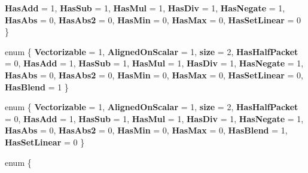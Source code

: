 \begin{DoxyCompactItemize}
{\bfseries Has\+Add} = 1, 
{\bfseries Has\+Sub} = 1, 
{\bfseries Has\+Mul} = 1, 
{\bfseries Has\+Div} = 1, 
\newline
{\bfseries Has\+Negate} = 1, 
{\bfseries Has\+Abs} = 0, 
{\bfseries Has\+Abs2} = 0, 
{\bfseries Has\+Min} = 0, 
\newline
{\bfseries Has\+Max} = 0, 
{\bfseries Has\+Set\+Linear} = 0
 \}
\item 
\mbox{\label{struct_eigen_1_1internal_1_1packet__traits_3_01std_1_1complex_3_01float_01_4_01_4_afbd46217ba20215fdce9b0b8c8995961}} 
enum \{ \newline
{\bfseries Vectorizable} = 1, 
{\bfseries Aligned\+On\+Scalar} = 1, 
{\bfseries size} = 2, 
{\bfseries Has\+Half\+Packet} = 0, 
\newline
{\bfseries Has\+Add} = 1, 
{\bfseries Has\+Sub} = 1, 
{\bfseries Has\+Mul} = 1, 
{\bfseries Has\+Div} = 1, 
\newline
{\bfseries Has\+Negate} = 1, 
{\bfseries Has\+Abs} = 0, 
{\bfseries Has\+Abs2} = 0, 
{\bfseries Has\+Min} = 0, 
\newline
{\bfseries Has\+Max} = 0, 
{\bfseries Has\+Set\+Linear} = 0, 
{\bfseries Has\+Blend} = 1
 \}
\item 
\mbox{\label{struct_eigen_1_1internal_1_1packet__traits_3_01std_1_1complex_3_01float_01_4_01_4_a7be4ce0b61b27e06f2d2aea3e27e4fba}} 
enum \{ \newline
{\bfseries Vectorizable} = 1, 
{\bfseries Aligned\+On\+Scalar} = 1, 
{\bfseries size} = 2, 
{\bfseries Has\+Half\+Packet} = 0, 
\newline
{\bfseries Has\+Add} = 1, 
{\bfseries Has\+Sub} = 1, 
{\bfseries Has\+Mul} = 1, 
{\bfseries Has\+Div} = 1, 
\newline
{\bfseries Has\+Negate} = 1, 
{\bfseries Has\+Abs} = 0, 
{\bfseries Has\+Abs2} = 0, 
{\bfseries Has\+Min} = 0, 
\newline
{\bfseries Has\+Max} = 0, 
{\bfseries Has\+Blend} = 1, 
{\bfseries Has\+Set\+Linear} = 0
 \}
\item 
\mbox{\label{struct_eigen_1_1internal_1_1packet__traits_3_01std_1_1complex_3_01float_01_4_01_4_ad4d858653896a6d6302ad00b28024981}} 
enum \{ \newline

\end{DoxyCompactItemize}
